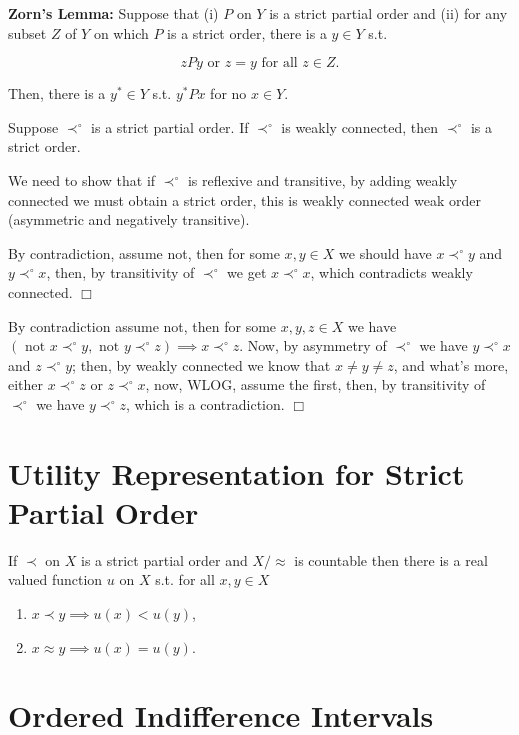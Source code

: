 \documentclass{article}
\theoremstyle{definition}
\def\tor{\text{ or }}
\def\tnot{\text{ not }}
\def\tforall{\text{ for all }}
\begin{document}
{\bf Zorn's Lemma:} Suppose that (i) $P$ on $Y$ is a strict partial order and (ii) for any subset $Z$ of $Y$ on which $P$ is a strict order, there is a $y\in Y$ s.t.

\begin{equation*}
zPy\tor z=y\tforall z\in Z.
\end{equation*}

Then, there is a $y^*\in Y$ s.t. $y^*Px$ for no $x\in Y$.

\def\precs{\prec^\circ}

 Suppose $\prec^\circ$ is a strict partial order. If $\prec^\circ$ is weakly connected, then $\prec^\circ$ is a strict order.

 We need to show that if $\prec^\circ$ is reflexive and transitive, by adding weakly connected we must obtain a strict order, this is weakly connected weak order (asymmetric and negatively transitive).

 By contradiction, assume not, then for some $x,y\in X$ we should have $x\precs y$ and $y\precs x$, then, by transitivity of $\precs$ we get $x\precs x$, which contradicts weakly connected. $\Box$

 By contradiction assume not, then for some $x,y,z\in X$ we have $(\tnot x\precs y,\tnot y\precs z)\implies x\precs z$. Now, by asymmetry of $\precs$ we have $y\precs x$ and $z\precs y$; then, by weakly connected we know that $x\not=y\not=z$, and what's more, either $x\precs z$ or $z\precs x$, now, WLOG, assume the first, then, by transitivity of $\precs$ we have $y\precs z$, which is a contradiction. $\Box$

\section{Utility Representation for Strict Partial Order}

 If $\prec$ on $X$ is a strict partial order and $X/\approx$ is countable then there is a real valued function $u$ on $X$ s.t. for all $x,y\in X$

\begin{enumerate}
\item $x\prec y\implies u(x)<u(y)$,
\item $x\approx y\implies u(x)=u(y)$.
\end{enumerate}

\section{Ordered Indifference Intervals}
\end{document}

